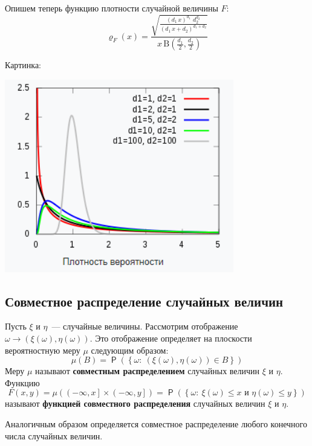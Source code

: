 \documentclass[12pt]{article}
\DeclareMathOperator{\prob}{\mathsf{P}}
\renewcommand{\leq}{\leqslant}
\begin{document}
    Опишем теперь функцию плотности случайной величины $F$:
    \begin{equation*}
        \varrho_F(x) = \frac{\sqrt{\frac{(d_1\,x)^{d_1}\,\,d_2^{d_2}}
        {(d_1\,x+d_2)^{d_1+d_2}}}}
        {x\,\mathrm{B}\!\left(\frac{d_1}{2},\frac{d_2}{2}\right)}
    \end{equation*}

    Картинка:
    \begin{center}
        \includegraphics[width=10cm]{fisher.png}
    \end{center}

    \subsection{Совместное распределение случайных величин}
    Пусть $\xi$ и $\eta$~--- случайные величины. Рассмотрим отображение $\omega \to \left(\xi(\omega), \eta(\omega)\right)$. Это отображение определяет на плоскости вероятностную меру $\mu$ следующим образом:
    \begin{equation*}
        \mu(B) = \prob(\left\{\omega:\ \left(\xi(\omega), \eta(\omega)\right) \in B\right\})
    \end{equation*}
    Меру $\mu$ называют \textbf{совместным распределением} случайных величин $\xi$ и $\eta$. Функцию 
    \begin{equation*}
        F(x,y) = \mu(\left(-\infty, x\right] \times \left(-\infty, y\right]) = \prob(\left\{\omega:\ \xi(\omega) \leq x \text{ и } \eta(\omega) \leq y\right\})
    \end{equation*}
    называют \textbf{функцией совместного распределения} случайных величин $\xi$ и $\eta$.

    Аналогичным образом определяется совместное распределение любого конечного числа случайных величин.
\end{document}

